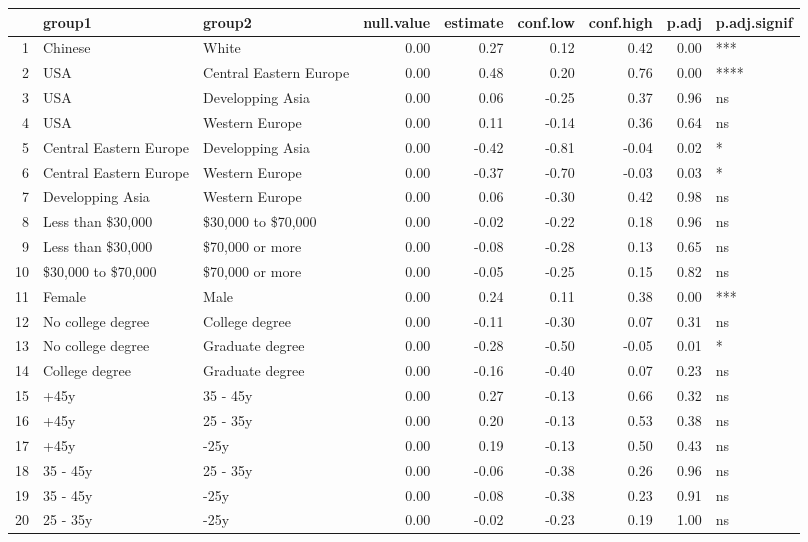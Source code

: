 \documentclass[]{report}
\begin{document}
\begin{table}[ht]
	\centering
	\begin{tabular}{rllrrrrrl}
		\hline
		& group1 & group2 & null.value & estimate & conf.low & conf.high & p.adj & p.adj.signif \\ 
		\hline
		1 & Chinese & White & 0.00 & 0.27 & 0.12 & 0.42 & 0.00 & *** \\ 
		2 & USA & Central Eastern Europe & 0.00 & 0.48 & 0.20 & 0.76 & 0.00 & **** \\ 
		3 & USA & Developping Asia & 0.00 & 0.06 & -0.25 & 0.37 & 0.96 & ns \\ 
		4 & USA & Western Europe & 0.00 & 0.11 & -0.14 & 0.36 & 0.64 & ns \\ 
		5 & Central Eastern Europe & Developping Asia & 0.00 & -0.42 & -0.81 & -0.04 & 0.02 & * \\ 
		6 & Central Eastern Europe & Western Europe & 0.00 & -0.37 & -0.70 & -0.03 & 0.03 & * \\ 
		7 & Developping Asia & Western Europe & 0.00 & 0.06 & -0.30 & 0.42 & 0.98 & ns \\ 
		8 & Less than \$30,000 & \$30,000 to \$70,000 & 0.00 & -0.02 & -0.22 & 0.18 & 0.96 & ns \\ 
		9 & Less than \$30,000 & \$70,000 or more & 0.00 & -0.08 & -0.28 & 0.13 & 0.65 & ns \\ 
		10 & \$30,000 to \$70,000 & \$70,000 or more & 0.00 & -0.05 & -0.25 & 0.15 & 0.82 & ns \\ 
		11 & Female & Male & 0.00 & 0.24 & 0.11 & 0.38 & 0.00 & *** \\ 
		12 & No college degree & College degree & 0.00 & -0.11 & -0.30 & 0.07 & 0.31 & ns \\ 
		13 & No college degree & Graduate degree & 0.00 & -0.28 & -0.50 & -0.05 & 0.01 & * \\ 
		14 & College degree & Graduate degree & 0.00 & -0.16 & -0.40 & 0.07 & 0.23 & ns \\ 
		15 & +45y & 35 - 45y & 0.00 & 0.27 & -0.13 & 0.66 & 0.32 & ns \\ 
		16 & +45y & 25 - 35y & 0.00 & 0.20 & -0.13 & 0.53 & 0.38 & ns \\ 
		17 & +45y & -25y & 0.00 & 0.19 & -0.13 & 0.50 & 0.43 & ns \\ 
		18 & 35 - 45y & 25 - 35y & 0.00 & -0.06 & -0.38 & 0.26 & 0.96 & ns \\ 
		19 & 35 - 45y & -25y & 0.00 & -0.08 & -0.38 & 0.23 & 0.91 & ns \\ 
		20 & 25 - 35y & -25y & 0.00 & -0.02 & -0.23 & 0.19 & 1.00 & ns \\ 
		\hline
	\end{tabular}
\end{table}
	
\end{document}

